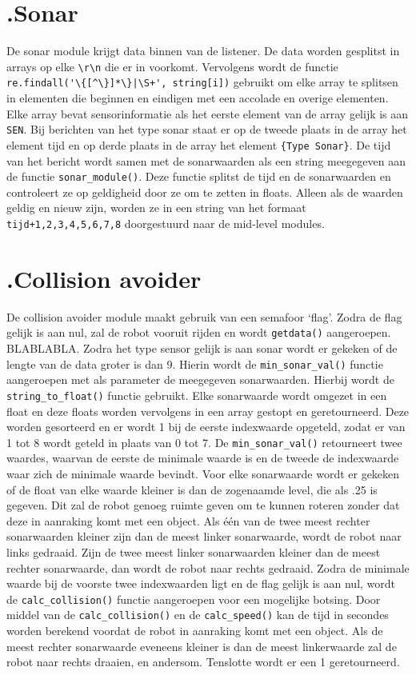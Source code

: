 \documentclass[a4paper,10pt]{article}
\begin{document}
\section*{\label{sonar}\thesection.\quad Sonar}
De sonar module krijgt data binnen van de listener. De data worden gesplitst in arrays op elke \verb!\r\n! die er in voorkomt. Vervolgens wordt de functie \verb!re.findall('\{[^\}]*\}|\S+', string[i])! gebruikt om elke array te splitsen in elementen die beginnen en eindigen met een accolade en overige elementen. Elke array bevat sensorinformatie als het eerste element van de array gelijk is aan \verb!SEN!. Bij berichten van het type sonar staat er op de tweede plaats in de array het element tijd en op derde plaats in de array het element \verb!{Type Sonar}!. De tijd van het bericht wordt samen met de sonarwaarden als een string meegegeven aan de functie \verb!sonar_module()!. Deze functie splitst de tijd en de sonarwaarden en controleert ze op geldigheid door ze om te zetten in floats. Alleen als de waarden geldig en nieuw zijn, worden ze in een string van het formaat \verb!tijd+1,2,3,4,5,6,7,8! doorgestuurd naar de mid-level modules.

\section*{\label{collisionavoider}\thesection.\quad Collision avoider}
De collision avoider module maakt gebruik van een semafoor `flag'. Zodra de flag gelijk is aan nul, zal de robot vooruit rijden en wordt \verb!getdata()! aangeroepen. BLABLABLA. Zodra het type sensor gelijk is aan sonar wordt er gekeken of de lengte van de data groter is dan 9. Hierin wordt de \verb!min_sonar_val()! functie aangeroepen met als parameter de meegegeven sonarwaarden. Hierbij wordt de \verb!string_to_float()! functie gebruikt. Elke sonarwaarde wordt omgezet in een float en deze floats worden vervolgens in een array gestopt en geretourneerd. Deze worden gesorteerd en er wordt 1 bij de eerste indexwaarde opgeteld, zodat er van 1 tot 8 wordt geteld in plaats van 0 tot 7. De \verb!min_sonar_val()! retourneert twee waardes, waarvan de eerste de minimale waarde is en de tweede de indexwaarde waar zich de minimale waarde bevindt.
Voor elke sonarwaarde wordt er gekeken of de float van elke waarde kleiner is dan de zogenaamde level, die als .25 is gegeven. Dit zal de robot genoeg ruimte geven om te kunnen roteren zonder dat deze in aanraking komt met een object. Als \'{e}\'{e}n van de twee meest rechter sonarwaarden kleiner zijn dan de meest linker sonarwaarde, wordt de robot naar links gedraaid. Zijn de twee meest linker sonarwaarden kleiner dan de meest rechter sonarwaarde, dan wordt de robot naar rechts gedraaid. Zodra de minimale waarde bij de voorste twee indexwaarden ligt en de flag gelijk is aan nul, wordt de \verb!calc_collision()! functie aangeroepen voor een mogelijke botsing. Door middel van de \verb!calc_collision()! en de \verb!calc_speed()! kan de tijd in secondes worden berekend voordat de robot in aanraking komt met een object. Als de meest rechter sonarwaarde eveneens kleiner is dan de meest linkerwaarde zal de robot naar rechts draaien, en andersom. Tenslotte wordt er een 1 geretourneerd.
\end{document}
